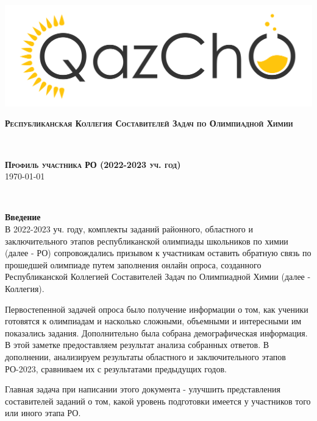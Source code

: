 \documentclass[12pt,openany]{extbook}
\begin{document}
\begin{titlepage}


\newcommand{\HRule}{\rule{\linewidth}{0.5mm}} %

\center %

\includegraphics[width=0.5\linewidth]{logo_color.jpg}\\[1.0cm]


\begin{minipage}{0.5\textwidth}
\begin{flushleft} \large
\textsc{\textbf{Республиканская Коллегия Составителей Задач по Олимпиадной Химии}}
\end{flushleft}
\end{minipage}
~
\begin{minipage}{0.4\textwidth}
\begin{flushright} \large
\textsc{\textbf{Профиль участника РО (2022-2023 уч. год)}}\\
\textsc{\today}
\end{flushright}
\end{minipage}\\[2.0cm]

\begin{minipage}{0.93\textwidth}
\begin{flushleft}
  

\textbf{\large Введение}\\[0.5cm]
В 2022-2023 уч. году, комплекты заданий районного, областного и заключительного этапов республиканской олимпиады школьников по химии (далее - РО) сопровождались призывом к участникам оставить обратную связь по прошедшей олимпиаде путем заполнения онлайн опроса, созданного Республиканской Коллегией Составителей Задач по Олимпиадной Химии (далее - Коллегия). 

Первостепенной задачей опроса было получение информации о том, как ученики готовятся к олимпиадам и насколько сложными, объемными и интересными им показались задания. Дополнительно была собрана демографическая информация. В этой заметке предоставляем результат анализа собранных ответов. В дополнении, анализируем результаты областного и заключительного этапов РО-2023, сравниваем их с результатами предыдущих годов.

Главная задача при написании этого документа - улучшить представления составителей заданий о том, какой уровень подготовки имеется у участников того или иного этапа РО. 
\end{flushleft}
\end{minipage}


\end{titlepage}
\end{document}

